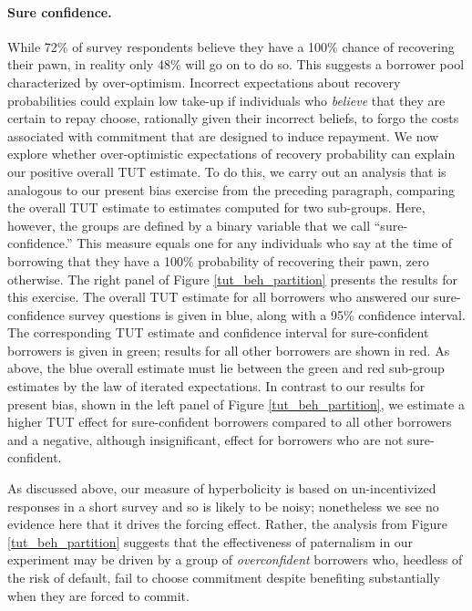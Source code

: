 \documentclass[oneside,11pt]{article}
\begin{document}
\paragraph{Sure confidence.} While 72\% of survey respondents believe they have a 100\% chance of recovering their pawn, in reality only 48\% will go on to do so.  
This suggests a borrower pool characterized by over-optimism.
Incorrect expectations about recovery probabilities could explain low take-up if individuals who \emph{believe} that they are certain to repay choose, rationally given their incorrect beliefs, to forgo the costs associated with commitment that are designed to induce repayment. 
We now explore whether over-optimistic expectations of recovery probability can explain our positive overall TUT estimate.
To do this, we carry out an analysis that is analogous to our present bias exercise from the preceding paragraph, comparing the overall TUT estimate to estimates computed for two sub-groups.
Here, however, the groups are defined by a binary variable that we call ``sure-confidence.''
This measure equals one for any individuals who say at the time of borrowing that they have a 100\% probability of recovering their pawn, zero otherwise.
The right panel of Figure \ref{tut_beh_partition} presents the results for this exercise.
The overall TUT estimate for all borrowers who answered our sure-confidence survey questions is given in blue, along with a 95\% confidence interval.
The corresponding TUT estimate and confidence interval for sure-confident borrowers is given in green; results for all other borrowers are shown in red.
As above, the blue overall estimate must lie between the green and red sub-group estimates by the law of iterated expectations.
In contrast to our results for present bias, shown in the left panel of Figure \ref{tut_beh_partition}, we estimate a higher TUT effect for sure-confident borrowers compared to all other borrowers and a negative, although insignificant, effect for borrowers who are not sure-confident.

As discussed above, our measure of hyperbolicity is based on un-incentivized responses in a short survey and so is likely to be noisy; nonetheless we see no evidence here that it drives the forcing effect.  Rather, the analysis from Figure \ref{tut_beh_partition} suggests that the effectiveness of paternalism in our experiment may be driven by a group of \emph{overconfident} borrowers who, heedless of the risk of default, fail to choose commitment despite benefiting substantially when they are forced to commit. 
\end{document}
